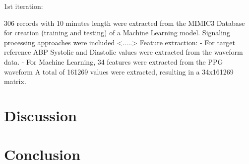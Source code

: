 \documentclass[10pt, bibliography=totoc]{scrartcl}
\begin{document}
1st iteration:

306 records with 10 minutes length were extracted from the MIMIC3 Database for creation (training and testing) of a Machine Learning model.
Signaling processing approaches were included <.....>
Feature extraction:
- For target reference ABP Systolic and Diastolic values were extracted from the waveform data.
- For Machine Learning, 34 features were extracted from the PPG waveform
A total of 161269 values were extracted, resulting in a 34x161269 matrix.


\section{Discussion}
\section{Conclusion}



\end{document}
